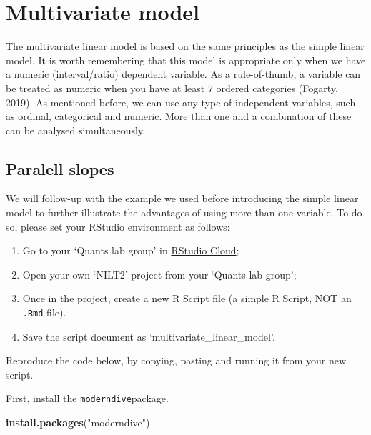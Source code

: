\documentclass[
]{book}
\newenvironment{Shaded}{\begin{snugshade}}{\end{snugshade}}
\newcommand{\FunctionTok}[1]{\textcolor[rgb]{0.13,0.29,0.53}{\textbf{#1}}}
\newcommand{\NormalTok}[1]{#1}
\newcommand{\StringTok}[1]{\textcolor[rgb]{0.31,0.60,0.02}{#1}}
\providecommand{\tightlist}{%
  \setlength{\itemsep}{0pt}\setlength{\parskip}{0pt}}
\begin{document}
\hypertarget{multivariate-model}{%
\section{Multivariate model}\label{multivariate-model}}

The multivariate linear model is based on the same principles as the simple linear model. It is worth remembering that this model is appropriate only when we have a numeric (interval/ratio) dependent variable. As a rule-of-thumb, a variable can be treated as numeric when you have at least 7 ordered categories (Fogarty, 2019). As mentioned before, we can use any type of independent variables, such as ordinal, categorical and numeric. More than one and a combination of these can be analysed simultaneously.

\hypertarget{paralell-slopes}{%
\subsection{Paralell slopes}\label{paralell-slopes}}

We will follow-up with the example we used before introducing the simple linear model to further illustrate the advantages of using more than one variable. To do so, please set your RStudio environment as follows:

\begin{enumerate}
\def\labelenumi{\arabic{enumi}.}
\tightlist
\item
  Go to your `Quants lab group' in \href{https://rstudio.cloud/}{RStudio Cloud};
\item
  Open your own `NILT2' project from your `Quants lab group';
\item
  Once in the project, create a new R Script file (a simple R Script, NOT an \texttt{.Rmd} file).
\item
  Save the script document as `multivariate\_linear\_model'.
\end{enumerate}

Reproduce the code below, by copying, pasting and running it from your new script.

First, install the \texttt{moderndive}package.

\begin{Shaded}
\begin{Highlighting}[]
\FunctionTok{install.packages}\NormalTok{(}\StringTok{"moderndive"}\NormalTok{)}
\end{Highlighting}
\end{Shaded}
\end{document}
